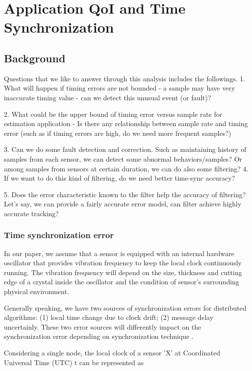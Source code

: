 \section{Application QoI and Time Synchronization}

\subsection{Background}
 Questions that we like to answer
through this analysis includes the followings. 1.  What will happen
if timing errors are not bounded - a sample may have very inaccurate
timing value - can we detect this unusual event (or fault)?

2.  What could be the upper bound of timing error versus sample rate
for estimation application - Is there any relationship between
sample rate and timing error (such as if timing errors are high, do
we need more frequent samples?)

3.  Can we do some fault detection and correction. Such as
maintaining history of samples from each sensor, we can detect some
abnormal behaviors/samples? Or among samples from sensors at certain
duration, we can do also some filtering? 4.  If we want to do this
kind of filtering, do we need better time-sync accuracy?

5.  Does the error characteristic known to the filter help the
accuracy of filtering? Let's say, we can provide a fairly accurate
error model, can filter achieve highly accurate tracking?

\subsubsection{Time synchronization error}
 In our paper, we assume that
a sensor is equipped with an internal hardware oscillator that
provides vibration frequency to keep the local clock continuously
running. The vibration frequency will depend on the size, thickness
and cutting edge of a crystal inside the oscillator and the
condition of sensor's surrounding physical environment.

Generally speaking, we have two sources of synchronization errors
for distributed algorithms: (1) local time change due to clock
drift; (2) message delay uncertainly. These two error sources will
differently impact on the synchronization error depending on
synchronization technique \cite{wsn-timecali}.

Considering a single node, the local clock of a sensor 'X' at
Coordinated Universal Time (UTC) t can be represented as
\cite{timing-error}

